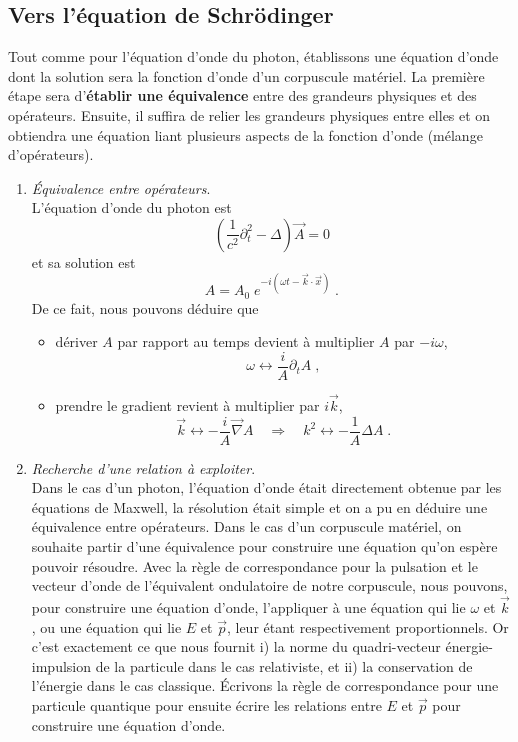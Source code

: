 \documentclass[12pt, a4paper]{book}
\begin{document}
\subsection{Vers l'équation de Schrödinger}
Tout comme pour l'équation d'onde du photon, établissons une équation d'onde dont la solution sera la fonction d'onde d'un corpuscule matériel. La première étape sera d'\textbf{établir une équivalence} entre des grandeurs physiques et des opérateurs. Ensuite, il suffira de relier les grandeurs physiques entre elles et on obtiendra une équation liant plusieurs aspects de la fonction d'onde (mélange d'opérateurs).\\

\begin{enumerate}[label =  (\alph*)]
\item \textit{Équivalence entre opérateurs}. \\
L'équation d'onde du photon est
$$\left(\dfrac{1}{c^2} \partial_t ^2 - \Delta \right) \vec A = 0$$
et sa solution est $$
A = A_0 \; e^{-i(\omega t - \vec k \cdot \vec x)} \; .$$
De ce fait, nous pouvons déduire que 
\begin{itemize}
\item dériver $A$ par rapport au temps devient à multiplier $A$ par $-i\omega$,
$$\boxed{\omega \longleftrightarrow \dfrac{i}{A} \partial_t A} \; , $$
\item prendre le gradient revient à multiplier par $i\vec k$, 
$$\vec k \longleftrightarrow -\dfrac{i}{A} \vec \nabla A \quad \Rightarrow \quad \boxed{k^2 \longleftrightarrow -\dfrac{1}{A} \Delta A} \; .$$
\end{itemize}

\item \textit{Recherche d'une relation à exploiter}. \\
Dans le cas d'un photon, l'équation d'onde était directement obtenue par les équations de Maxwell, la résolution était simple et on a pu en déduire une équivalence entre opérateurs. Dans le cas d'un corpuscule matériel, on souhaite partir d'une équivalence pour construire une équation qu'on espère pouvoir résoudre. Avec la règle de correspondance pour la pulsation et le vecteur d'onde de l'équivalent ondulatoire de notre corpuscule, nous pouvons, pour construire une équation d'onde, l'appliquer à une équation qui lie $\omega$ et $\vec k$, ou une équation qui lie $E$ et $\vec p$, leur étant respectivement proportionnels. Or c'est exactement ce que nous fournit i) la norme du quadri-vecteur énergie-impulsion de la particule dans le cas relativiste, et ii) la conservation de l'énergie dans le cas classique. Écrivons la règle de correspondance pour une particule quantique pour ensuite écrire les relations entre $E$ et $\vec p$ pour construire une équation d'onde.


\end{enumerate}
\end{document}
